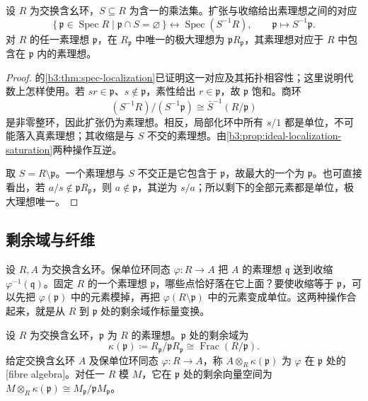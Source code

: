 \begin{proposition}\label{b3:prop:localized-prime-ideals}
	设 \(R\) 为交换含幺环，\(S\subseteq R\) 为含一的乘法集。扩张与收缩给出素理想之间的对应
	\[
		\{\,\mathfrak p\in\operatorname{Spec}R\mid\mathfrak p\cap S=\varnothing\,\} \longleftrightarrow\operatorname{Spec}(S^{-1}R), \qquad \mathfrak p\longmapsto S^{-1}\mathfrak p.
	\]
	对 \(R\) 的任一素理想 \(\mathfrak p\)，在 \(R_{\mathfrak p}\) 中唯一的极大理想为 \(\mathfrak pR_{\mathfrak p}\)，其素理想对应于 \(R\) 中包含在 \(\mathfrak p\) 内的素理想。
\end{proposition}
\begin{proof}
	的\cref{b3:thm:spec-localization}已证明这一对应及其拓扑相容性；这里说明代数上怎样使用。若 \(sr\in\mathfrak p\)、\(s\notin\mathfrak p\)，素性给出 \(r\in\mathfrak p\)，故 \(\mathfrak p\) 饱和。商环
	\[
		(S^{-1}R)/(S^{-1}\mathfrak p)\cong\bar S^{-1}(R/\mathfrak p)
	\]
	是非零整环，因此扩张仍为素理想。相反，局部化环中所有 \(s/1\) 都是单位，不可能落入真素理想；其收缩是与 \(S\) 不交的素理想。由\cref{b3:prop:ideal-localization-saturation}两种操作互逆。

	取 \(S=R\setminus\mathfrak p\)。一个素理想与 \(S\) 不交正是它包含于 \(\mathfrak p\)，故最大的一个为 \(\mathfrak p\)。也可直接看出，若 \(a/s\notin\mathfrak pR_{\mathfrak p}\)，则 \(a\notin\mathfrak p\)，其逆为 \(s/a\)；所以剩下的全部元素都是单位，极大理想唯一。
\end{proof}

\subsection{剩余域与纤维}
\label{b3:subsec:0202:03}

设 \(R,A\) 为交换含幺环。保单位环同态 \(\varphi:R\rightarrow A\) 把 \(A\) 的素理想 \(\mathfrak q\) 送到收缩 \(\varphi^{-1}(\mathfrak q)\)。固定 \(R\) 的一个素理想 \(\mathfrak p\)，哪些点恰好落在它上面？要使收缩等于 \(\mathfrak p\)，可以先把 \(\varphi(\mathfrak p)\) 中的元素模掉，再把 \(\varphi(R\setminus\mathfrak p)\) 中的元素变成单位。这两种操作合起来，就是从 \(R\) 到 \(\mathfrak p\) 处的剩余域作标量变换。

\begin{definition}\label{b3:def:residue-field-fibre}
	设 \(R\) 为交换含幺环，\(\mathfrak p\) 为 \(R\) 的素理想。\(\mathfrak p\) 处的剩余域为
	\[
		\kappa(\mathfrak p)\coloneqq R_{\mathfrak p}/\mathfrak pR_{\mathfrak p} \cong\operatorname{Frac}(R/\mathfrak p).
	\]
	给定交换含幺环 \(A\) 及保单位环同态 \(\varphi:R\rightarrow A\)，称 \(A\otimes_R\kappa(\mathfrak p)\) 为 \(\varphi\) 在 \(\mathfrak p\) 处的[fibre algebra]。对任一 \(R\) 模 \(M\)，它在 \(\mathfrak p\) 处的剩余向量空间为 \(M\otimes_R\kappa(\mathfrak p)\cong M_{\mathfrak p}/\mathfrak pM_{\mathfrak p}\)。
\end{definition}

